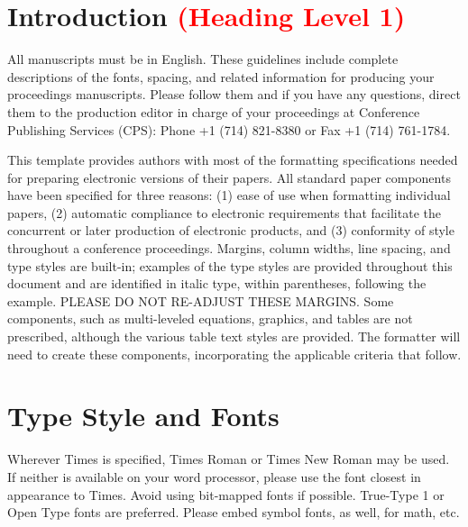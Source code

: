 \documentclass[conference]{IEEEconf}
\begin{document}
%
\IEEEpeerreviewmaketitle
%
%







%
%
\section{Introduction \textcolor{red}{(Heading Level 1)}}
All manuscripts must be in English. These guidelines include complete descriptions of the fonts, spacing, and related information for producing your proceedings manuscripts. Please follow them and if you have any questions, direct them to the production editor in charge of your proceedings at Conference Publishing Services (CPS): Phone +1 (714) 821-8380 or Fax +1 (714) 761-1784.

This template provides authors with most of the formatting specifications needed for preparing electronic versions of their papers. All standard paper components have been specified for three reasons: (1) ease of use when formatting individual papers, (2) automatic compliance to electronic requirements that facilitate the concurrent or later production of electronic products, and (3) conformity of style throughout a conference proceedings. Margins, column widths, line spacing, and type styles are built-in; examples of the type styles are provided throughout this document and are identified in italic type, within parentheses, following the example. PLEASE DO NOT RE-ADJUST THESE MARGINS. Some components, such as multi-leveled equations, graphics, and tables are not prescribed, although the various table text styles are provided. The formatter will need to create these components, incorporating the applicable criteria that follow.

\section{Type Style and Fonts}
Wherever Times is specified, Times Roman or Times New Roman may be used. If neither is available on your word processor, please use the font closest in appearance to Times. Avoid using bit-mapped fonts if possible. True-Type 1 or Open Type fonts are preferred. Please embed symbol fonts, as well, for math, etc.
\end{document}
